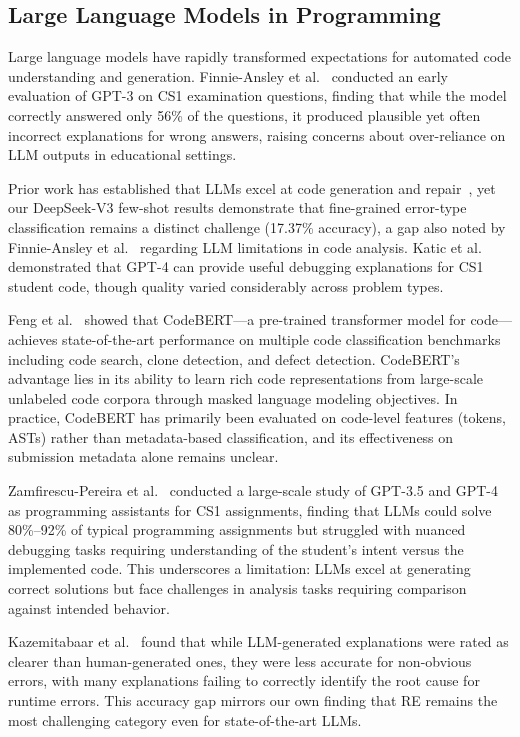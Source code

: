 \documentclass[10pt,a4paper]{article}
\begin{document}
\subsection{Large Language Models in Programming}

Large language models have rapidly transformed expectations for automated code
understanding and generation. Finnie-Ansley et
al.~\cite{finnie2022robots}
conducted an early evaluation of GPT-3 on CS1 examination questions, finding
that while the model correctly answered only 56\% of the questions, it
produced plausible yet often incorrect explanations for wrong answers,
raising concerns about over-reliance on LLM outputs in educational settings.

Prior work has established that LLMs excel at code generation and
repair~\cite{kazemitabaar2024impact}, yet our DeepSeek-V3 few-shot results
demonstrate that fine-grained error-type classification remains a distinct
challenge (17.37\% accuracy), a gap also noted by Finnie-Ansley et
al.~\cite{finnie2022robots} regarding LLM limitations in code analysis. Katic
et al.~\cite{raihan2025large} demonstrated that GPT-4 can provide useful
debugging explanations for CS1 student code, though quality varied
considerably across problem types.

Feng et al.~\cite{feng2020codebert} showed that CodeBERT---a pre-trained
transformer model for code---achieves state-of-the-art performance on multiple
code classification benchmarks including code search, clone detection, and
defect detection. CodeBERT's advantage lies in its ability to learn rich code
representations from large-scale unlabeled code corpora through masked
language modeling objectives. In practice, CodeBERT has primarily been evaluated
on code-level features (tokens, ASTs) rather than metadata-based
classification, and its effectiveness on submission metadata alone remains
unclear.

Zamfirescu-Pereira et al.~\cite{zamfirescu2023what} conducted a large-scale
study of GPT-3.5 and GPT-4 as programming assistants for CS1 assignments,
finding that LLMs could solve 80\%--92\% of typical programming assignments
but struggled with nuanced debugging tasks requiring understanding of the
student's intent versus the implemented code. This underscores a
limitation: LLMs excel at generating correct solutions but face challenges in
analysis tasks requiring comparison against intended behavior.

Kazemitabaar et al.~\cite{kazemitabaar2024impact} found that while
LLM-generated explanations were rated as clearer than human-generated ones,
they were less accurate for non-obvious errors, with many explanations failing
to correctly identify the root cause for runtime errors. This accuracy gap
mirrors our own finding that RE remains the most challenging category even for
state-of-the-art LLMs.
\end{document}
